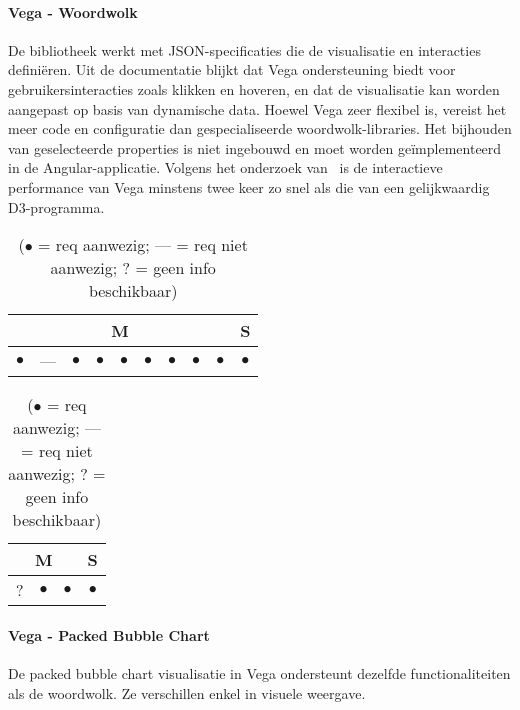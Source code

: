 \paragraph{Vega - Woordwolk}
De bibliotheek werkt met JSON-specificaties die de visualisatie en interacties definiëren. Uit de documentatie blijkt dat Vega ondersteuning biedt voor gebruikersinteracties zoals klikken en hoveren, en dat de visualisatie kan worden aangepast op basis van dynamische data. Hoewel Vega zeer flexibel is, vereist het meer code en configuratie dan gespecialiseerde woordwolk-libraries. Het bijhouden van geselecteerde properties is niet ingebouwd en moet worden geïmplementeerd in de Angular-applicatie. Volgens het onderzoek van~\textcite{Satyanarayan2017} is de interactieve performance van Vega minstens twee keer zo snel als die van een gelijkwaardig D3-programma.
\begin{table}[htbp]
    \centering
    \begin{minipage}{0.48\textwidth}
        \centering
        \begin{tabular}{|ccccccccc|c|}
            \hline
            \multicolumn{9}{|c|}{M} & \multicolumn{1}{c|}{S} \\
            \midrule
            $\bullet$ & --- & $\bullet$ & $\bullet$ & $\bullet$ & $\bullet$ & $\bullet$ & $\bullet$ & $\bullet$ & $\bullet$ \\
            \bottomrule
        \end{tabular}
        \caption{Vega Woordwolk - Functionele requirements}
    \end{minipage}
    \hfill
    \begin{minipage}{0.48\textwidth}
        \centering
        \begin{tabular}{|ccc|c|}
            \hline
            \multicolumn{3}{|c|}{M} & \multicolumn{1}{c|}{S} \\
            \midrule
            ? & $\bullet$ & $\bullet$ & $\bullet$ \\
            \bottomrule
        \end{tabular}
        \caption{Vega Woordwolk - Niet-functionele requirements}
    \end{minipage}
    \caption*{($\bullet$ = req aanwezig; --- = req niet aanwezig; ? = geen info beschikbaar)}
\end{table}
\paragraph{Vega - Packed Bubble Chart}
De packed bubble chart visualisatie in Vega ondersteunt dezelfde functionaliteiten als de woordwolk. Ze verschillen enkel in visuele weergave.

